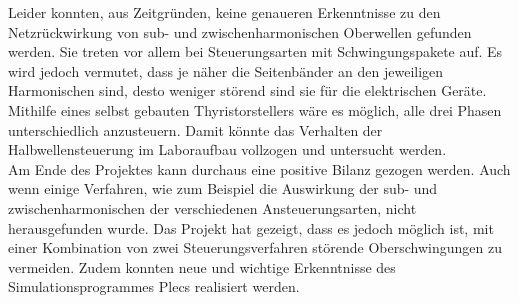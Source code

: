 Leider konnten, aus Zeitgründen, keine genaueren Erkenntnisse zu den Netzrückwirkung von sub- und zwischenharmonischen Oberwellen gefunden werden. Sie treten vor allem bei Steuerungsarten mit Schwingungspakete auf. Es wird jedoch vermutet, dass je näher die Seitenbänder an den jeweiligen Harmonischen sind, desto weniger störend sind sie für die elektrischen Geräte.\\
Mithilfe eines selbst gebauten Thyristorstellers wäre es möglich, alle drei Phasen unterschiedlich anzusteuern. Damit könnte das Verhalten der Halbwellensteuerung im Laboraufbau vollzogen und untersucht werden.\\
Am Ende des Projektes kann durchaus eine positive Bilanz gezogen werden. Auch wenn einige Verfahren, wie zum Beispiel die Auswirkung der sub- und zwischenharmonischen der verschiedenen Ansteuerungsarten, nicht herausgefunden wurde. Das Projekt hat gezeigt, dass es jedoch möglich ist, mit einer Kombination von zwei Steuerungsverfahren störende Oberschwingungen zu vermeiden. Zudem konnten neue und wichtige Erkenntnisse des Simulationsprogrammes Plecs realisiert werden.  





